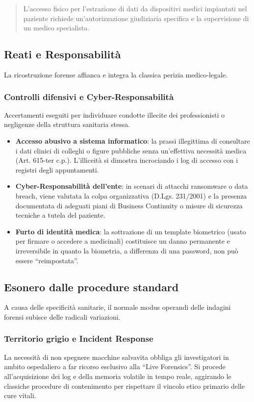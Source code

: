 \documentclass[11pt,a4paper]{article}
\begin{document}
\begin{quote}
L'accesso fisico per l'estrazione di dati da dispositivi medici impiantati nel paziente richiede un'autorizzazione giudiziaria specifica e la supervisione di un medico specialista.
\end{quote}

\subsection{Reati e Responsabilità}
La ricostruzione forense affianca e integra la classica perizia medico-legale.

\subsubsection{Controlli difensivi e Cyber-Responsabilità}
Accertamenti eseguiti per individuare condotte illecite dei professionisti o negligenze della struttura sanitaria stessa.
\begin{itemize}
    \item \textbf{Accesso abusivo a sistema informatico}: la prassi illegittima di consultare i dati clinici di colleghi o figure pubbliche senza un'effettiva necessità medica (Art. 615-ter c.p.). L'illiceità si dimostra incrociando i log di accesso con i registri degli appuntamenti.
    \item \textbf{Cyber-Responsabilità dell'ente}: in scenari di attacchi ransomware o data breach, viene valutata la colpa organizzativa (D.Lgs. 231/2001) e la presenza documentata di adeguati piani di Business Continuity o misure di sicurezza tecniche a tutela del paziente.
    \item \textbf{Furto di identità medica}: la sottrazione di un template biometrico (usato per firmare o accedere a medicinali) costituisce un danno permanente e irreversibile in quanto la biometria, a differenza di una password, non può essere ``reimpostata''.
\end{itemize}

\subsection{Esonero dalle procedure standard}
A causa delle specificità sanitarie, il normale modus operandi delle indagini forensi subisce delle radicali variazioni.

\subsubsection{Territorio grigio e Incident Response}
La necessità di non spegnere macchine salvavita obbliga gli investigatori in ambito ospedaliero a far ricorso esclusivo alla ``Live Forensics''. Si procede all'acquisizione dei log e della memoria volatile in tempo reale, aggirando le classiche procedure di contenimento per rispettare il vincolo etico primario delle cure vitali.
\end{document}
